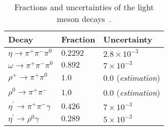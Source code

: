       {
\renewcommand{\arraystretch}{1.25}
 \begin{table}
\centering
\scriptsize
\begin{tabular}{l | l | l }
Decay & Fraction & Uncertainty \\
\hline

$\eta \rightarrow \pi^{+} \pi^{-} \pi^{0}$  &  $0.2292$ & $2.8\times 10^{-3}$ \\


$\omega \rightarrow \pi^{+} \pi^{-} \pi^{0}$ & $0.892$ & $7\times 10^{-3}$ \\ 
$\rho^{+} \rightarrow \pi^{+} \pi^{0}$ & $1.0$&$0.0$ (\textit{estimation}) \\

$\rho^{0} \rightarrow \pi^{+} \pi^{-}$ & $1.0$ & $0.0$ (\textit{estimation})\\  %

$\eta^{\prime} \rightarrow  \pi^{+} \pi^{-} \gamma$ & $0.426$ & $7\times 10^{-3}$ \\

$\eta^{\prime} \rightarrow \rho^{0} \gamma$ & $0.289$ &$5\times 10^{-3}$ \\
\end{tabular}
\caption{Fractions and uncertainties of the light meson decays~\cite{PhysRevD.98.030001}.}
\label{tab:Ds_bkg_modes}
\end{table}
    }    
    


